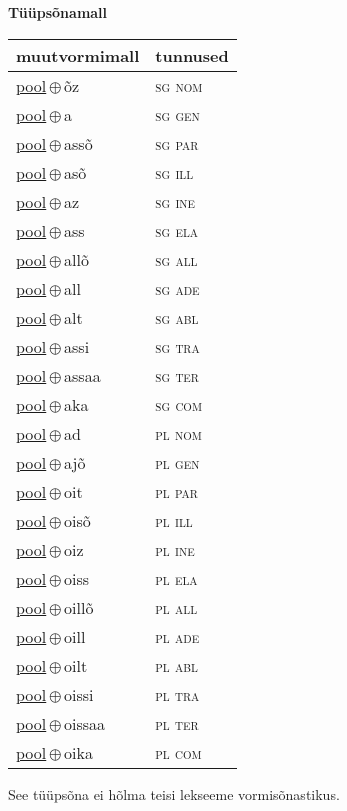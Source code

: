 

\vspace{3.5em}
\noindent \begin{minipage}{\textwidth}
\noindent \textbf{Tüüpsõnamall \,}\\

\begin{sideways}
\begin{tabular}{l l}
muutvormimall & tunnused \\
\hline
\underline{pool}\,$\oplus$\,õz & \textsc{ sg nom } \\
\underline{pool}\,$\oplus$\,a & \textsc{ sg gen } \\
\underline{pool}\,$\oplus$\,assõ & \textsc{ sg par } \\
\underline{pool}\,$\oplus$\,asõ & \textsc{ sg ill } \\
\underline{pool}\,$\oplus$\,az & \textsc{ sg ine } \\
\underline{pool}\,$\oplus$\,ass & \textsc{ sg ela } \\
\underline{pool}\,$\oplus$\,allõ & \textsc{ sg all } \\
\underline{pool}\,$\oplus$\,all & \textsc{ sg ade } \\
\underline{pool}\,$\oplus$\,alt & \textsc{ sg abl } \\
\underline{pool}\,$\oplus$\,assi & \textsc{ sg tra } \\
\underline{pool}\,$\oplus$\,assaa & \textsc{ sg ter } \\
\underline{pool}\,$\oplus$\,aka & \textsc{ sg com } \\
\underline{pool}\,$\oplus$\,ad & \textsc{ pl nom } \\
\underline{pool}\,$\oplus$\,ajõ & \textsc{ pl gen } \\
\underline{pool}\,$\oplus$\,oit & \textsc{ pl par } \\
\underline{pool}\,$\oplus$\,oisõ & \textsc{ pl ill } \\
\underline{pool}\,$\oplus$\,oiz & \textsc{ pl ine } \\
\underline{pool}\,$\oplus$\,oiss & \textsc{ pl ela } \\
\underline{pool}\,$\oplus$\,oillõ & \textsc{ pl all } \\
\underline{pool}\,$\oplus$\,oill & \textsc{ pl ade } \\
\underline{pool}\,$\oplus$\,oilt & \textsc{ pl abl } \\
\underline{pool}\,$\oplus$\,oissi & \textsc{ pl tra } \\
\underline{pool}\,$\oplus$\,oissaa & \textsc{ pl ter } \\
\underline{pool}\,$\oplus$\,oika & \textsc{ pl com } \\
\end{tabular}
\end{sideways}
\label{tab:tüüpsõnamall-poolõz}

\end{minipage}

 
\vspace{1em}
\noindent See tüüpsõna ei hõlma teisi lekseeme vormi\-sõnastikus.
